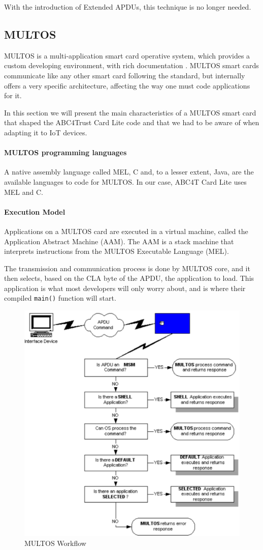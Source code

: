 With the introduction of Extended APDUs, this technique is no longer needed.






\subsection{MULTOS}

MULTOS is a multi-application smart card operative system, which provides a custom developing environment, with rich documentation \citep{MultosTechLib}. MULTOS smart cards communicate like any other smart card following the standard, but internally offers a very specific architecture, affecting the way one must code applications for it.

In this section we will present the main characteristics of a MULTOS smart card that shaped the ABC4Trust Card Lite code and that we had to be aware of when adapting it to IoT devices.


\paragraph{MULTOS programming languages} A native assembly language called MEL, C and, to a lesser extent, Java, are the available languages to code for MULTOS. In our case, ABC4T Card Lite uses MEL and C.

\paragraph{Execution Model}
Applications on a MULTOS card are executed in a virtual machine, called the Application Abstract Machine (AAM). The AAM is a stack machine that interprets instructions from the MULTOS Executable
Language (MEL).

The transmission and communication process is done by MULTOS core, and it then selects, based on the CLA byte of the APDU, the application to load. This application is what most developers will only worry about, and is where their compiled \texttt{main()} function will start.

\begin{figure}[bth]
	\begin{center}
		\includegraphics[width=0.6\linewidth]{gfx/multosWorkflow}
	\end{center}
	\caption{MULTOS Workflow}
	\label{fig:multosWorkflow}
\end{figure}

